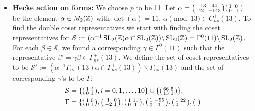 \begin{itemize}
\item \textbf{Hecke action on forms: }  We choose $p$ to be 11. Let $\alpha = \begin{psmallmatrix}
-13 & 44 \\ 42 & -143 
\end{psmallmatrix} \begin{psmallmatrix}
1 & 0 \\ 0 & 11
\end{psmallmatrix}$ be the element $\alpha \in M_2(\mathbb{Z})$ with $\det(\alpha) = 11$, $\alpha \pmod{13} \in C_{ns}^+(13).$ To find the double coset representatives we start with finding the coset representatives for $\mathcal{S} := (\alpha^{-1} \operatorname{SL}_2(\mathbb{Z}) \alpha \cap \operatorname{SL}_2(\mathbb{Z})) \backslash \operatorname{SL}_2(\mathbb{Z}) = \Gamma^0(11) \backslash \operatorname{SL}_2(\mathbb{Z})$. For each $\beta \in \mathcal{S}$, we found a corresponding $\gamma \in \Gamma^0(11)$ such that the representative $\beta' = \gamma \beta \in \Gamma_{ns}^+(13)$. We define the set of coset representatives to be $\mathcal{S}' := (\alpha^{-1} \Gamma_{ns}^+(13) \alpha \cap \Gamma_{ns}^+ (13)) \backslash \Gamma_{ns}^+(13)$ and the set of corresponding $\gamma$'s to be $\Gamma$: \begin{align*} 
\mathcal{S} &= \{ \begin{psmallmatrix}
1 & i \\ 0 & 1
\end{psmallmatrix} , i = 0,1, \ldots, 10 \} \cup \{ \begin{psmallmatrix}
66 & 5 \\ 13 & 1
\end{psmallmatrix}\}, \\
\Gamma &= \{ \begin{psmallmatrix}
1 & 0 \\ 0 & 1
\end{psmallmatrix},
\begin{psmallmatrix}
1 & 0 \\ -2 & 1
\end{psmallmatrix}, \begin{psmallmatrix}
1 & 11 \\ 0 & 1
\end{psmallmatrix}, \begin{psmallmatrix}
1 & -55 \\ 0 & 1
\end{psmallmatrix},\begin{psmallmatrix}
1 & 22 \\ 0 & 1
\end{psmallmatrix},\begin{psmallmatrix}

\end{psmallmatrix}
\end{align*}
\end{itemize}
